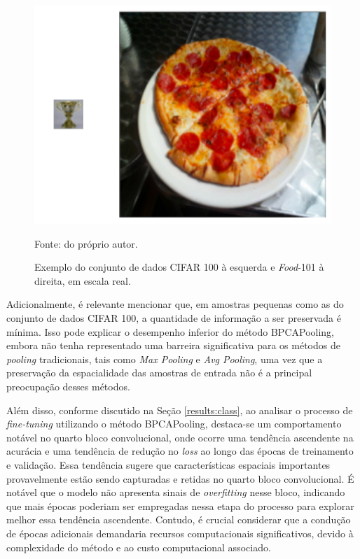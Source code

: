 \begin{figure}[H]
    \centering
    \caption{Exemplo do conjunto de dados CIFAR 100 à esquerda e \textit{Food}-101 à direita, em escala real.}
    \label{results:fig:datasets:0}
    \includegraphics[width=1\textwidth]{recursos/imagens/results/dataset_diff.png}

    Fonte: do próprio autor.
\end{figure}

Adicionalmente, é relevante mencionar que, em amostras pequenas como as do conjunto de dados CIFAR 100, a quantidade de informação a ser preservada é mínima. Isso pode explicar o desempenho inferior do método BPCAPooling, embora não tenha representado uma barreira significativa para os métodos de \textit{pooling} tradicionais, tais como \textit{Max Pooling} e \textit{Avg Pooling}, uma vez que a preservação da espacialidade das amostras de entrada não é a principal preocupação desses métodos.

Além disso, conforme discutido na Seção \ref{results:class}, ao analisar o processo de \textit{fine-tuning} utilizando o método BPCAPooling, destaca-se um comportamento notável no quarto bloco convolucional, onde ocorre uma tendência ascendente na acurácia e uma tendência de redução no \textit{loss} ao longo das épocas de treinamento e validação. Essa tendência sugere que características espaciais importantes provavelmente estão sendo capturadas e retidas no quarto bloco convolucional. É notável que o modelo não apresenta sinais de \textit{overfitting} nesse bloco, indicando que mais épocas poderiam ser empregadas nessa etapa do processo para explorar melhor essa tendência ascendente. Contudo, é crucial considerar que a condução de épocas adicionais demandaria recursos computacionais significativos, devido à complexidade do método e ao custo computacional associado.

